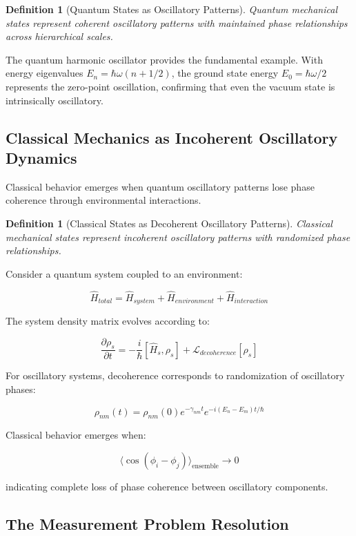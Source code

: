 \documentclass[11pt,a4paper]{article}
\newtheorem{definition}[theorem]{Definition}
\theoremstyle{remark}
\begin{document}
\begin{definition}[Quantum States as Oscillatory Patterns]
Quantum mechanical states represent coherent oscillatory patterns with maintained phase relationships across hierarchical scales.
\end{definition}

The quantum harmonic oscillator provides the fundamental example. With energy eigenvalues $E_n = \hbar\omega(n + 1/2)$, the ground state energy $E_0 = \hbar\omega/2$ represents the zero-point oscillation, confirming that even the vacuum state is intrinsically oscillatory.

\subsection{Classical Mechanics as Incoherent Oscillatory Dynamics}

Classical behavior emerges when quantum oscillatory patterns lose phase coherence through environmental interactions.

\begin{definition}[Classical States as Decoherent Oscillatory Patterns]
Classical mechanical states represent incoherent oscillatory patterns with randomized phase relationships.
\end{definition}

Consider a quantum system coupled to an environment:

$$\hat{H}_{total} = \hat{H}_{system} + \hat{H}_{environment} + \hat{H}_{interaction}$$

The system density matrix evolves according to:

$$\frac{\partial \rho_s}{\partial t} = -\frac{i}{\hbar}[\hat{H}_s, \rho_s] + \mathcal{L}_{decoherence}[\rho_s]$$

For oscillatory systems, decoherence corresponds to randomization of oscillatory phases:

$$\rho_{nm}(t) = \rho_{nm}(0) e^{-\gamma_{nm} t} e^{-i(E_n - E_m)t/\hbar}$$

Classical behavior emerges when:

$$\langle \cos(\phi_i - \phi_j) \rangle_{\text{ensemble}} \to 0$$

indicating complete loss of phase coherence between oscillatory components.

\subsection{The Measurement Problem Resolution}
\end{document}

